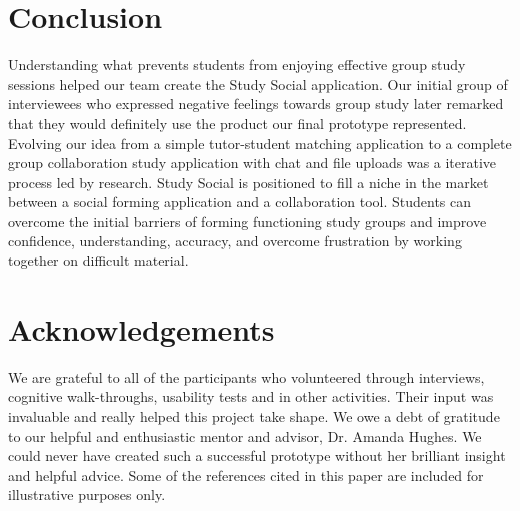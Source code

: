 \documentclass{sigchi-ext}
\begin{document}
\section{Conclusion}

Understanding what prevents students from enjoying effective group study
sessions helped our team create the Study Social application. Our initial group
of interviewees who expressed negative feelings towards group study later
remarked that they would definitely use the product our final prototype
represented.  Evolving our idea from a simple tutor-student matching
application to a complete group collaboration study application with chat and
file uploads was a iterative process led by research.  Study Social is
positioned to fill a niche in the market between a social forming application
and a collaboration tool.  Students can overcome the initial barriers of
forming functioning study groups and improve confidence, understanding,
accuracy, and overcome frustration by working together on difficult material.        


\section{Acknowledgements}

We are grateful to all of the participants who
volunteered through interviews, cognitive walk-throughs, usability tests and in
other activities. Their input was invaluable and really helped this project
take shape.  We owe a debt of gratitude to our helpful and enthusiastic mentor
and advisor, Dr. Amanda Hughes. We could never have created such a successful
prototype without her brilliant insight and helpful advice.  Some of the
references cited in this paper are included for illustrative purposes only.



\balance{}

% 

% 

\end{document}
